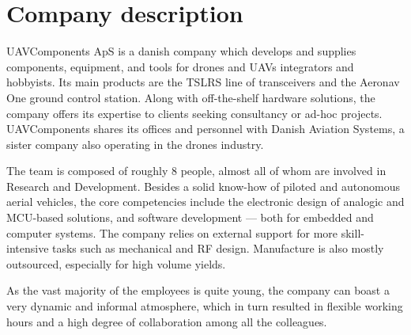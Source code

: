 \section{Company description}
UAVComponents ApS is a danish company which develops and supplies components, equipment, and tools for drones and UAVs integrators and hobbyists.
Its main products are the TSLRS line of transceivers and the Aeronav One ground control station.
Along with off-the-shelf hardware solutions, the company offers its expertise to clients seeking consultancy or ad-hoc projects.
UAVComponents shares its offices and personnel with Danish Aviation Systems, a sister company also operating in the drones industry.

The team is composed of roughly 8 people, almost all of whom are involved in Research and Development.
Besides a solid know-how of piloted and autonomous aerial vehicles, the core competencies include the electronic design of analogic and MCU-based solutions, and software development --- both for embedded and computer systems.
The company relies on external support for more skill-intensive tasks such as mechanical and RF design.
Manufacture is also mostly outsourced, especially for high volume yields.

As the vast majority of the employees is quite young, the company can boast a very dynamic and informal atmosphere, which in turn resulted in flexible working hours and a high degree of collaboration among all the colleagues.
